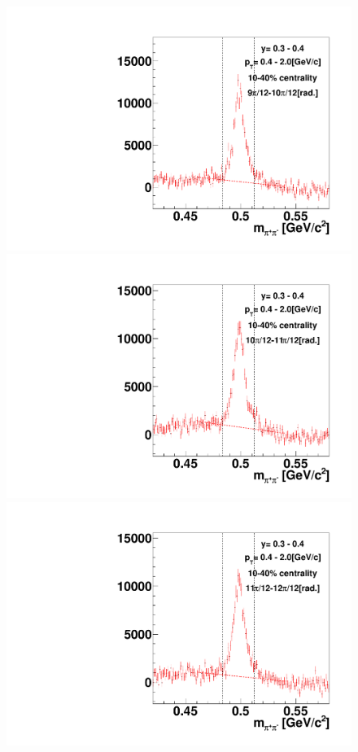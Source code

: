 \begin{figure}[h]
\includegraphics[width=0.14\linewidth]{chapterX/fig/ks_v1_sig/kf_ptslice0_cent1_ks_flow_phi10_rap1.pdf}
\includegraphics[width=0.14\linewidth]{chapterX/fig/ks_v1_sig/kf_ptslice0_cent1_ks_flow_phi11_rap1.pdf}
\includegraphics[width=0.14\linewidth]{chapterX/fig/ks_v1_sig/kf_ptslice0_cent1_ks_flow_phi12_rap1.pdf}


\end{figure}
